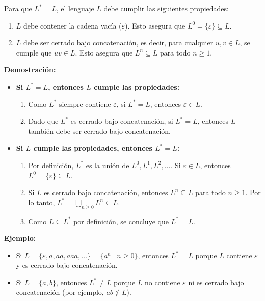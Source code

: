 \documentclass[12pt]{book} %
\begin{document}
\begin{solucion}

Para que \( L^* = L \), el lenguaje \( L \) debe cumplir las siguientes propiedades:

\begin{enumerate}
    \item \( L \) debe contener la cadena vacía (\( \varepsilon \)). Esto asegura que \( L^0 = \{\varepsilon\} \subseteq L \).
    \item \( L \) debe ser cerrado bajo concatenación, es decir, para cualquier \( u, v \in L \), se cumple que \( uv \in L \). Esto asegura que \( L^n \subseteq L \) para todo \( n \geq 1 \).
\end{enumerate}

\textbf{Demostración:}

\begin{itemize}
    \item \textbf{Si \( L^* = L \), entonces \( L \) cumple las propiedades:}
        \begin{enumerate}
            \item Como \( L^* \) siempre contiene \( \varepsilon \), si \( L^* = L \), entonces \( \varepsilon \in L \).
            \item Dado que \( L^* \) es cerrado bajo concatenación, si \( L^* = L \), entonces \( L \) también debe ser cerrado bajo concatenación.
        \end{enumerate}

    \item \textbf{Si \( L \) cumple las propiedades, entonces \( L^* = L \):}
        \begin{enumerate}
            \item Por definición, \( L^* \) es la unión de \( L^0, L^1, L^2, \dots \). Si \( \varepsilon \in L \), entonces \( L^0 = \{\varepsilon\} \subseteq L \).
            \item Si \( L \) es cerrado bajo concatenación, entonces \( L^n \subseteq L \) para todo \( n \geq 1 \). Por lo tanto, \( L^* = \bigcup_{n \geq 0} L^n \subseteq L \).
            \item Como \( L \subseteq L^* \) por definición, se concluye que \( L^* = L \).
        \end{enumerate}
\end{itemize}

\textbf{Ejemplo:}
\begin{itemize}
    \item Si \( L = \{\varepsilon, a, aa, aaa, \dots\} = \{a^n \mid n \geq 0\} \), entonces \( L^* = L \) porque \( L \) contiene \( \varepsilon \) y es cerrado bajo concatenación.
    \item Si \( L = \{a, b\} \), entonces \( L^* \neq L \) porque \( L \) no contiene \( \varepsilon \) ni es cerrado bajo concatenación (por ejemplo, \( ab \notin L \)).
\end{itemize}

\end{solucion}
\end{document}
